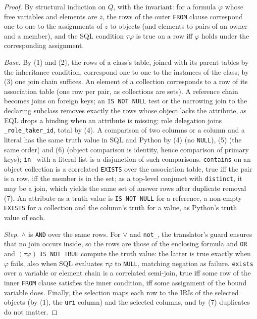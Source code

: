\begin{proof}
By structural induction on $Q$, with the invariant: for a formula $\varphi$ whose free variables
and elements are $\bar z$, the rows of the outer \texttt{FROM} clause correspond one to one to
the assignments of $\bar z$ to objects (and elements to pairs of an owner and a member), and the
SQL condition $\tau\varphi$ is true on a row iff $\varphi$ holds under the corresponding
assignment.

\emph{Base.} By (1) and (2), the rows of a class's table, joined with its parent tables by the
inheritance condition, correspond one to one to the instances of the class; by (3) one join chain
suffices. An element of a collection corresponds to a row of its association table (one row per
pair, as collections are sets). A reference chain becomes joins on foreign keys; an
\texttt{IS NOT NULL} test or the narrowing join to the declaring subclass removes exactly the rows
whose object lacks the attribute, as EQL drops a binding when an attribute is missing; role
delegation joins \texttt{\_role\_taker\_id}, total by (4). A comparison of two columns or a
column and a literal has the same truth value in SQL and Python by (4) (no \texttt{NULL}), (5)
(the same order) and (6) (object comparison is identity, hence comparison of primary keys);
\texttt{in\_} with a literal list is a disjunction of such comparisons. \texttt{contains} on an
object collection is a correlated \texttt{EXISTS} over the association table, true iff the pair
is a row, iff the member is in the set; as a top-level conjunct with \texttt{distinct}, it may be
a join, which yields the same set of answer rows after duplicate removal (7). An attribute as a
truth value is \texttt{IS NOT NULL} for a reference, a non-empty \texttt{EXISTS} for a
collection and the column's truth for a value, as Python's truth value of each.

\emph{Step.} $\wedge$ is \texttt{AND} over the same rows. For $\vee$ and \texttt{not\_}, the
translator's guard ensures that no join occurs inside, so the rows are those of the enclosing
formula and \texttt{OR} and $(\tau\varphi)$ \texttt{IS NOT TRUE} compute the truth value: the
latter is true exactly when $\varphi$ fails, also when SQL evaluates $\tau\varphi$ to
\texttt{NULL}, matching negation as failure. \texttt{exists} over a variable or element chain is
a correlated semi-join, true iff some row of the inner \texttt{FROM} clause satisfies the inner
condition, iff some assignment of the bound variable does. Finally, the selection maps each row
to the IRIs of the selected objects (by (1), the \texttt{uri} column) and the selected columns,
and by (7) duplicates do not matter.
\end{proof}

